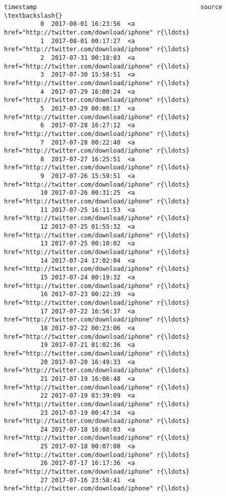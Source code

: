 \documentclass[11pt]{article}
\begin{document}
\begin{Verbatim}[commandchars=\\\{\}]
                       timestamp                                             source  \textbackslash{}
          0  2017-08-01 16:23:56  <a href="http://twitter.com/download/iphone" r{\ldots}   
          1  2017-08-01 00:17:27  <a href="http://twitter.com/download/iphone" r{\ldots}   
          2  2017-07-31 00:18:03  <a href="http://twitter.com/download/iphone" r{\ldots}   
          3  2017-07-30 15:58:51  <a href="http://twitter.com/download/iphone" r{\ldots}   
          4  2017-07-29 16:00:24  <a href="http://twitter.com/download/iphone" r{\ldots}   
          5  2017-07-29 00:08:17  <a href="http://twitter.com/download/iphone" r{\ldots}   
          6  2017-07-28 16:27:12  <a href="http://twitter.com/download/iphone" r{\ldots}   
          7  2017-07-28 00:22:40  <a href="http://twitter.com/download/iphone" r{\ldots}   
          8  2017-07-27 16:25:51  <a href="http://twitter.com/download/iphone" r{\ldots}   
          9  2017-07-26 15:59:51  <a href="http://twitter.com/download/iphone" r{\ldots}   
          10 2017-07-26 00:31:25  <a href="http://twitter.com/download/iphone" r{\ldots}   
          11 2017-07-25 16:11:53  <a href="http://twitter.com/download/iphone" r{\ldots}   
          12 2017-07-25 01:55:32  <a href="http://twitter.com/download/iphone" r{\ldots}   
          13 2017-07-25 00:10:02  <a href="http://twitter.com/download/iphone" r{\ldots}   
          14 2017-07-24 17:02:04  <a href="http://twitter.com/download/iphone" r{\ldots}   
          15 2017-07-24 00:19:32  <a href="http://twitter.com/download/iphone" r{\ldots}   
          16 2017-07-23 00:22:39  <a href="http://twitter.com/download/iphone" r{\ldots}   
          17 2017-07-22 16:56:37  <a href="http://twitter.com/download/iphone" r{\ldots}   
          18 2017-07-22 00:23:06  <a href="http://twitter.com/download/iphone" r{\ldots}   
          19 2017-07-21 01:02:36  <a href="http://twitter.com/download/iphone" r{\ldots}   
          20 2017-07-20 16:49:33  <a href="http://twitter.com/download/iphone" r{\ldots}   
          21 2017-07-19 16:06:48  <a href="http://twitter.com/download/iphone" r{\ldots}   
          22 2017-07-19 03:39:09  <a href="http://twitter.com/download/iphone" r{\ldots}   
          23 2017-07-19 00:47:34  <a href="http://twitter.com/download/iphone" r{\ldots}   
          24 2017-07-18 16:08:03  <a href="http://twitter.com/download/iphone" r{\ldots}   
          25 2017-07-18 00:07:08  <a href="http://twitter.com/download/iphone" r{\ldots}   
          26 2017-07-17 16:17:36  <a href="http://twitter.com/download/iphone" r{\ldots}   
          27 2017-07-16 23:58:41  <a href="http://twitter.com/download/iphone" r{\ldots}   

\end{Verbatim}
\end{document}
